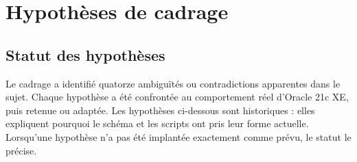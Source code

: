 \chapter{Hypothèses de cadrage}
\label{ann:hypotheses}

\section{Statut des hypothèses}

Le cadrage a identifié quatorze ambiguïtés ou contradictions apparentes dans le
sujet. Chaque hypothèse a été confrontée au comportement réel d'Oracle 21c XE,
puis retenue ou adaptée. Les hypothèses ci-dessous sont historiques : elles
expliquent pourquoi le schéma et les scripts ont pris leur forme actuelle.
Lorsqu'une hypothèse n'a pas été implantée exactement comme prévu, le statut le
précise.

